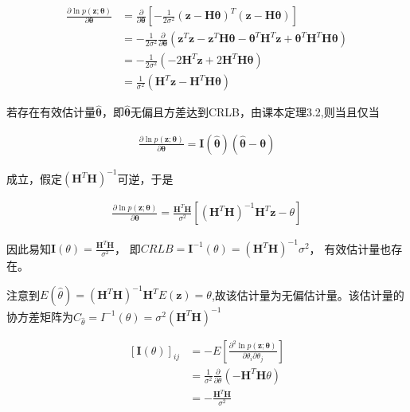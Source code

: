\documentclass[fontset=windows]{article}
\numberwithin{figure}{section}
\begin{document}
\begin{align*}
	\frac{\partial \ln p(\mathbf{z};\boldsymbol{\theta})}{\partial \boldsymbol{\theta}}
	 & =\frac{\partial}{\partial \boldsymbol{\theta}}\left[-\frac{1}{2\sigma^2}
	(\mathbf{z-H}\boldsymbol{\theta})^T(\mathbf{z-H}\boldsymbol{\theta})\right]                               \\
	 & = -\frac{1}{2\sigma^2}\frac{\partial}{\partial \boldsymbol{\theta}}\left(\mathbf{z}^T\mathbf{z}
	-\mathbf{z}^T\mathbf{H}\boldsymbol{\theta}-\boldsymbol{\theta}^T\mathbf{H}^T\mathbf{z}+
	\boldsymbol{\theta}^T\mathbf{H}^T\mathbf{H}\boldsymbol{\theta}\right)                                     \\
	 & =-\frac{1}{2\sigma^2}\left(-2\mathbf{H}^T\mathbf{z}+2\mathbf{H}^T\mathbf{H}\boldsymbol{\theta} \right) \\
	 & =\frac{1}{\sigma^2}\left(\mathbf{H}^T\mathbf{z}-\mathbf{H}^T\mathbf{H}\boldsymbol{\theta} \right)
\end{align*}

若存在有效估计量\(\hat{\boldsymbol{\theta}}\)，即\(\hat{\boldsymbol{\theta}}\)无偏且方差达到CRLB，由课本定理3.2,则当且仅当

\begin{align*}
	\frac{\partial \ln p(\mathbf{z};\boldsymbol{\theta})}{\partial \boldsymbol{\theta}}=
	\mathbf{I}(\hat{\boldsymbol{\theta}})(\hat{\boldsymbol{\theta}}-\boldsymbol{\theta})
\end{align*}

成立，假定\((\mathbf{H}^T\mathbf{H})^{-1}\)可逆，于是

\begin{align*}
	\frac{\partial \ln p(\mathbf{z};\boldsymbol{\theta})}{\partial \mathbf{\boldsymbol{\theta}}}=
	\frac{\mathbf{H}^T\mathbf{H}}{\sigma^2}\left[\left(\mathbf{H}^T\mathbf{H}\right)^{-1}
		\mathbf{H}^T\mathbf{z}-\theta\right]
\end{align*}

因此易知\(\mathbf{I}(\theta)=\frac{\mathbf{H}^T\mathbf{H}}{\sigma^2}\)，
即\(CRLB=\mathbf{I}^{-1}(\theta)=\left(\mathbf{H}^T\mathbf{H}\right)^{-1}\sigma^2\)，
有效估计量也存在。

注意到\(E(\hat{\theta})=(\boldsymbol{H}^T\boldsymbol{H})^{-1}\boldsymbol{H}^TE(\mathbf{z})=\theta\),故该估计量为无偏估计量。该估计量的协方差矩阵为\(C_{\hat{\theta}}=I^{-1}(\theta)=\sigma^2(\boldsymbol{H}^T\boldsymbol{H})^{-1}\)

\begin{align*}
	\left[\mathbf{I}(\theta)\right]_{ij}
	 & =-E\left[\frac{\partial^2 \ln p(\mathbf{z};\boldsymbol{\theta})}{\partial \theta_i \partial \theta_j}\right] \\
	 & =\frac{1}{\sigma^2}\frac{\partial}{\partial \theta}\left(-\mathbf{H}^T\mathbf{H}\theta\right)                \\
	 & =-\frac{\mathbf{H}^T\mathbf{H}}{\sigma^2}                                                                    \\
\end{align*}
\end{document}
